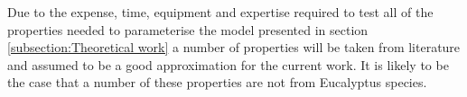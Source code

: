 Due to the expense, time, equipment and expertise required to test all of the
properties needed to parameterise the model presented in section \ref{subsection:Theoretical work} a number of
properties will be taken from literature and assumed to be a good approximation
for the current work. It is likely to be the case that a number of these
properties are not from Eucalyptus species.